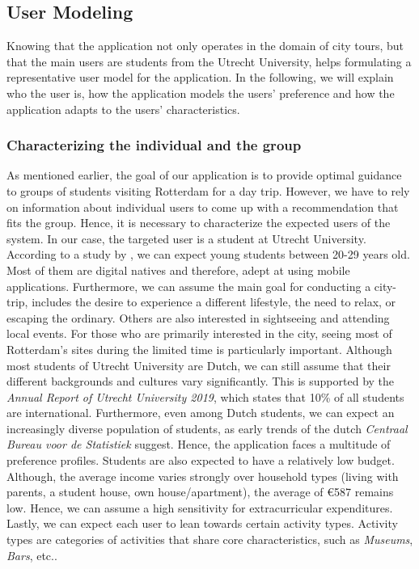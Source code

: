 \documentclass[11pt,a4paper,oneside]{article}
\begin{document}
\subsection{User Modeling}
\label{sec:UM}
Knowing that the application not only operates in the domain of city tours, but that the main users are students from the Utrecht University, helps formulating a representative user model for the application. In the following, we will explain who the user is, how the application models the users' preference and how the application adapts to the users' characteristics. 

\subsubsection{Characterizing the individual and the group}
As mentioned earlier, the goal of our application is to provide optimal guidance to groups of students visiting Rotterdam for a day trip. However, we have to rely on information about individual users to come up with a recommendation that fits the group. Hence, it is necessary to characterize the expected users of the system. In our case, the targeted user is a student at Utrecht University. According to a study by \citeauthor{AgeAverage_students}, we can expect young students between 20-29 years old.\cite{AgeAverage_students} Most of them are digital natives and therefore, adept at using mobile applications.\cite{prensky_DigitalNativesDigital_2001a} Furthermore, we can assume the main goal for conducting a city-trip, includes the desire to experience a different lifestyle, the need to relax, or escaping the ordinary. Others are also interested in sightseeing and attending local events.\cite{rita2019millennials} For those who are primarily interested in the city, seeing most of Rotterdam's sites during the limited time is particularly important. Although most students of Utrecht University are Dutch, we can still assume that their different backgrounds and cultures vary significantly. This is supported by the \emph{Annual Report of Utrecht University 2019}, which states that 10\% of all students are international.\cite{utrecht_UniversiteitUtrecht_2019} Furthermore, even among Dutch students, we can expect an increasingly diverse population of students, as early trends of the dutch \emph{Centraal Bureau voor de Statistiek} suggest.\cite{theovanmiltenburg_AllochtonenHogerOnderwijs_2007} Hence, the application faces a multitude of preference profiles. Students are also expected to have a relatively low budget. Although, the average income varies strongly over household types (living with parents, a student house, own house/apartment), the average of €587 remains low.\cite{kobus_OwnershipOncampusUse_2013} Hence, we can assume a high sensitivity for extracurricular expenditures. Lastly, we can expect each user to lean towards certain activity types. Activity types are categories of activities that share core characteristics, such as \emph{Museums}, \emph{Bars}, etc.. 
\end{document}
